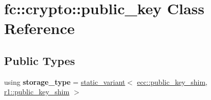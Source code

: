 \hypertarget{classfc_1_1crypto_1_1public__key}{}\section{fc\+:\+:crypto\+:\+:public\+\_\+key Class Reference}
\label{classfc_1_1crypto_1_1public__key}
\subsection*{Public Types}
\begin{DoxyCompactItemize}
\item 
\mbox{\label{classfc_1_1crypto_1_1public__key_a45196ba402e70048f9e805a519038b6f}} 
using {\bfseries storage\+\_\+type} = \mbox{\hyperlink{classfc_1_1static__variant}{static\+\_\+variant}}$<$ \mbox{\hyperlink{structfc_1_1ecc_1_1public__key__shim}{ecc\+::public\+\_\+key\+\_\+shim}}, \mbox{\hyperlink{structfc_1_1crypto_1_1r1_1_1public__key__shim}{r1\+::public\+\_\+key\+\_\+shim}} $>$
\end{DoxyCompactItemize}
